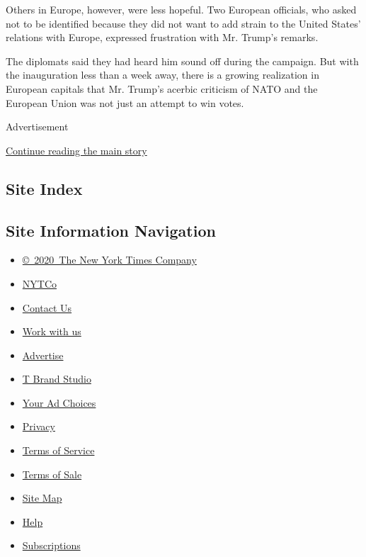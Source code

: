 Others in Europe, however, were less hopeful. Two European officials,
who asked not to be identified because they did not want to add strain
to the United States' relations with Europe, expressed frustration with
Mr. Trump's remarks.

The diplomats said they had heard him sound off during the campaign. But
with the inauguration less than a week away, there is a growing
realization in European capitals that Mr. Trump's acerbic criticism of
NATO and the European Union was not just an attempt to win votes.

Advertisement

\protect\hyperlink{after-bottom}{Continue reading the main story}

\hypertarget{site-index}{%
\subsection{Site Index}\label{site-index}}

\hypertarget{site-information-navigation}{%
\subsection{Site Information
Navigation}\label{site-information-navigation}}

\begin{itemize}
\tightlist
\item
  \href{https://help.nytimes.com/hc/en-us/articles/115014792127-Copyright-notice}{©~2020~The
  New York Times Company}
\end{itemize}

\begin{itemize}
\tightlist
\item
  \href{https://www.nytco.com/}{NYTCo}
\item
  \href{https://help.nytimes.com/hc/en-us/articles/115015385887-Contact-Us}{Contact
  Us}
\item
  \href{https://www.nytco.com/careers/}{Work with us}
\item
  \href{https://nytmediakit.com/}{Advertise}
\item
  \href{http://www.tbrandstudio.com/}{T Brand Studio}
\item
  \href{https://www.nytimes.com/privacy/cookie-policy\#how-do-i-manage-trackers}{Your
  Ad Choices}
\item
  \href{https://www.nytimes.com/privacy}{Privacy}
\item
  \href{https://help.nytimes.com/hc/en-us/articles/115014893428-Terms-of-service}{Terms
  of Service}
\item
  \href{https://help.nytimes.com/hc/en-us/articles/115014893968-Terms-of-sale}{Terms
  of Sale}
\item
  \href{https://spiderbites.nytimes.com}{Site Map}
\item
  \href{https://help.nytimes.com/hc/en-us}{Help}
\item
  \href{https://www.nytimes.com/subscription?campaignId=37WXW}{Subscriptions}
\end{itemize}
